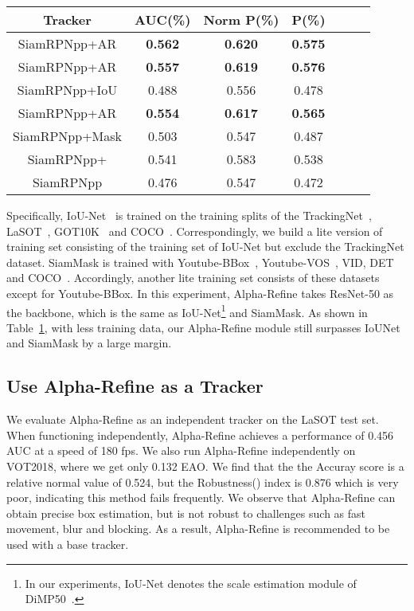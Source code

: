 \documentclass[final]{cvpr}
\begin{document}
{\begin{appendices}
\begin{table}[!h]
{\begin{tabular}{ccccccc}
   \hline
   \textbf{Tracker}     &\textbf{AUC}(\%)   &\textbf{Norm P}(\%)    &\textbf{P}(\%)  \\
    \hline
    SiamRPNpp+AR        &\textbf{\textcolor[rgb]{1,0,0}{0.562}} &\textbf{\textcolor[rgb]{1,0,0}{0.620}} &\textbf{\textcolor[rgb]{0,1,0}{0.575}}\\
    SiamRPNpp+AR   &\textbf{\textcolor[rgb]{0,1,0}{0.557}}   &\textbf{\textcolor[rgb]{0,1,0}{0.619}}   &\textbf{\textcolor[rgb]{1,0,0}{0.576}}\\
    SiamRPNpp+IoU       &0.488  &0.556  &0.478\\
    SiamRPNpp+AR  &\textbf{\textcolor[rgb]{0,0,1}{0.554}}   &\textbf{\textcolor[rgb]{0,0,1}{0.617}}   &\textbf{\textcolor[rgb]{0,0,1}{0.565}}\\
    SiamRPNpp+Mask      &0.503  &0.547  &0.487  \\
SiamRPNpp+ &0.541  &0.583  &0.538  \\
    SiamRPNpp           &0.476  &0.547  &0.472  \\
    \hline
\end{tabular}}
\vspace{-3mm}
\label{tab:com-refine}
\end{table}

Specifically, IoU-Net~\cite{DiMP} is trained on the training splits of the TrackingNet~\cite{Trackingnet}, LaSOT~\cite{LaSOT}, GOT10K~\cite{GOT10K} and COCO~\cite{COCO}. Correspondingly, we build a lite version of training set consisting of the training set of IoU-Net but exclude the TrackingNet dataset. 
SiamMask is trained with Youtube-BBox~\cite{Youtube}, Youtube-VOS~\cite{youtube-vos}, VID, DET~\cite{ImageNet} and COCO~\cite{COCO}. Accordingly, another lite training set consists of these datasets except for Youtube-BBox. In this experiment, Alpha-Refine takes ResNet-50 as the backbone, which is the same as IoU-Net\footnote{In our experiments, IoU-Net denotes the scale estimation module of DiMP50~\cite{DiMP}.} and SiamMask. As shown in Table~\ref{tab:com-refine}, with less training data, our Alpha-Refine module still surpasses IoUNet and SiamMask by a large margin.



\subsection{Use Alpha-Refine as a Tracker}

We evaluate Alpha-Refine as an independent tracker on the LaSOT test set. When functioning independently, Alpha-Refine achieves a performance of 0.456 AUC at a speed of 180 fps. 
We also run Alpha-Refine independently on VOT2018, where we get only 0.132 EAO. We find that the the Accuray score is a relative normal value of 0.524, but the Robustness() index is 0.876 which is very poor, indicating this method fails frequently. We observe that Alpha-Refine can obtain precise box estimation, but is not robust to challenges such as fast movement, blur and blocking. As a result, Alpha-Refine is recommended to be used with a base tracker.


\end{appendices}}
\end{document}
